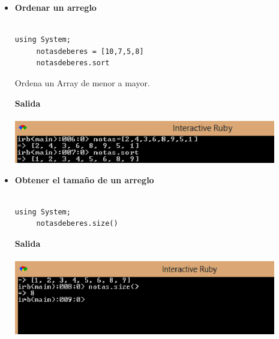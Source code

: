 \documentclass[11pt]{article} %
\begin{document}
\begin{itemize}
     \item {\bf Ordenar un arreglo}\\\\
\begin{lstlisting}[frame=single]  % Start your code-block
using System;
     notasdeberes = [10,7,5,8]
     notasdeberes.sort
\end{lstlisting}
\begin{center}
Ordena un Array de menor a mayor.
\end{center}
\bf Salida\\\\
    \includegraphics[width=0.9\textwidth]{./imagenes/OrdenarArreglo}\\


\newpage

    \item  {\bf Obtener el tamaño de un arreglo}\\\\
\begin{lstlisting}[frame=single]  % Start your code-block
using System;
     notasdeberes.size()
\end{lstlisting}
\bf Salida\\\\
        \includegraphics[width=0.9\textwidth]{./imagenes/SizeArreglo}\\\\



\end{itemize}
\end{document}
